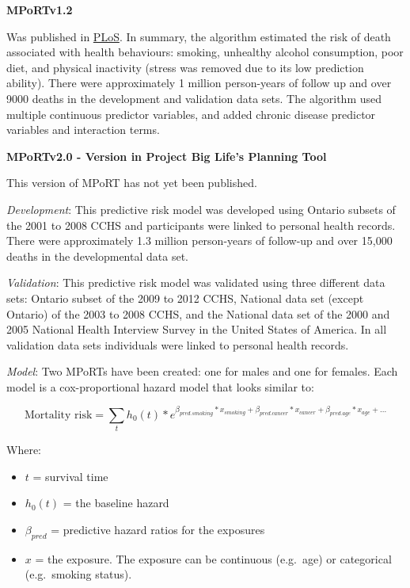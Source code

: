 \documentclass[]{book}
\providecommand{\tightlist}{%
  \setlength{\itemsep}{0pt}\setlength{\parskip}{0pt}}
\begin{document}
\textbf{MPoRTv1.2}

Was published in
\href{https://journals.plos.org/plosmedicine/article?id=10.1371/journal.pmed.1002082}{PLoS}.
In summary, the algorithm estimated the risk of death associated with
health behaviours: smoking, unhealthy alcohol consumption, poor diet,
and physical inactivity (stress was removed due to its low prediction
ability). There were approximately 1 million person-years of follow up
and over 9000 deaths in the development and validation data sets. The
algorithm used multiple continuous predictor variables, and added
chronic disease predictor variables and interaction terms.

\textbf{MPoRTv2.0 - Version in Project Big Life's Planning Tool}

This version of MPoRT has not yet been published.

\emph{Development}: This predictive risk model was developed using
Ontario subsets of the 2001 to 2008 CCHS and participants were linked to
personal health records. There were approximately 1.3 million
person-years of follow-up and over 15,000 deaths in the developmental
data set.

\emph{Validation}: This predictive risk model was validated using three
different data sets: Ontario subset of the 2009 to 2012 CCHS, National
data set (except Ontario) of the 2003 to 2008 CCHS, and the National
data set of the 2000 and 2005 National Health Interview Survey in the
United States of America. In all validation data sets individuals were
linked to personal health records.

\emph{Model}: Two MPoRTs have been created: one for males and one for
females. Each model is a cox-proportional hazard model that looks
similar to:

\[ \text{Mortality risk} = \sum_t h_0(t) * e^{\beta_{pred.smoking}*x_{smoking}+\beta_{pred.cancer}*x_{cancer} + \beta_{pred.age}*x_{age} +...}  \]

Where:

\begin{itemize}
\tightlist
\item
  \(t\) = survival time
\item
  \(h_0(t)\) = the baseline hazard
\item
  \(\beta_{pred}\) = predictive hazard ratios for the exposures
\item
  \(x\) = the exposure. The exposure can be continuous (e.g.~age) or
  categorical (e.g.~smoking status).
\end{itemize}
\end{document}
